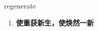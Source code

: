 
\begin{frame}
{\huge regenerate}
\begin{center}
\begin{enumerate}\Large
  \item \textbf{使重获新生，使焕然一新}
\end{enumerate}
\end{center}
\end{frame}
